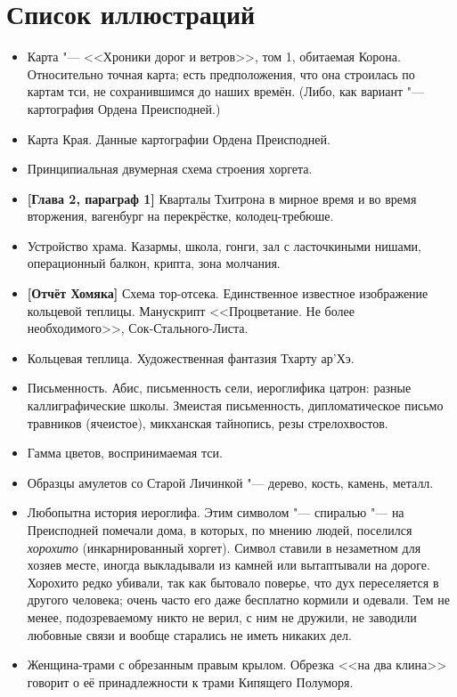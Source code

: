 \section{Список иллюстраций}

\begin{itemize}
\item Карта "--- <<Хроники дорог и ветров>>, том 1, обитаемая Корона.
Относительно точная карта;
есть предположения, что она строилась по картам тси, не сохранившимся до наших времён.
(Либо, как вариант "--- картография Ордена Преисподней.)
\item Карта Края.
Данные картографии Ордена Преисподней.
\item Принципиальная двумерная схема строения хоргета.
\item \textbf{[Глава 2, параграф 1]}
Кварталы Тхитрона в мирное время и во время вторжения, вагенбург на перекрёстке, колодец-требюше.
\item Устройство храма.
Казармы, школа, гонги, зал с ласточкиными нишами, операционный балкон, крипта, зона молчания.
\item \textbf{[Отчёт Хомяка]}
Схема тор-отсека.
Единственное известное изображение кольцевой теплицы.
Манускрипт <<Процветание. Не более необходимого>>, Сок-Стального-Листа.
\item Кольцевая теплица.
Художественная фантазия Тхарту ар'Хэ.
\item Письменность.
Абис, письменность сели, иероглифика цатрон: разные каллиграфические школы.
Змеистая письменность, дипломатическое письмо травников (ячеистое), микханская тайнопись, резы стрелохвостов.
\item Гамма цветов, воспринимаемая тси.
\item Образцы амулетов со Старой Личинкой "--- дерево, кость, камень, металл.
\item Любопытна история иероглифа.
Этим символом "--- спиралью "--- на Преисподней помечали дома, в которых, по мнению людей, поселился \emph{хорохито} (инкарнированный хоргет).
Символ ставили в незаметном для хозяев месте, иногда выкладывали из камней или вытаптывали на дороге.
Хорохито редко убивали, так как бытовало поверье, что дух переселяется в другого человека;
очень часто его даже бесплатно кормили и одевали.
Тем не менее, подозреваемому никто не верил, с ним не дружили, не заводили любовные связи и вообще старались не иметь никаких дел.
\item Женщина-трами с обрезанным правым крылом.
Обрезка <<на два клина>> говорит о её принадлежности к трами Кипящего Полуморя.

\end{itemize}

